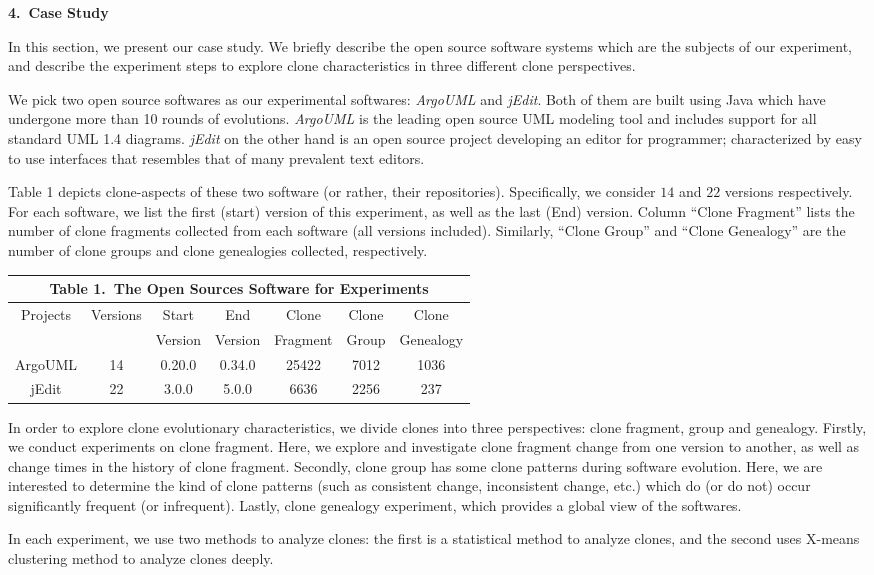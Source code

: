 \begin{center}{\large\bf 4.\ Case Study}\end{center}

In this section, we present our case study. 
We briefly describe the open source software systems which are the subjects of our experiment, and describe the experiment steps to explore clone characteristics in three different clone perspectives. 

We pick two open source softwares as our experimental softwares: {\em ArgoUML} and {\em jEdit}. Both of them are built using Java which have undergone more than 10 rounds of evolutions. {\em ArgoUML} is the leading open source UML modeling tool and includes support for all standard UML 1.4 diagrams. {\em jEdit} on the other hand is an open source project developing an editor for programmer; characterized by easy to use interfaces that resembles that of many prevalent text editors.

Table 1 depicts clone-aspects of these two software (or rather, their repositories). Specifically, we consider $14$ and $22$ versions respectively.  For each software, we list the first (start) version of this experiment, as well as the last (End) version. Column ``Clone Fragment'' lists the number of clone fragments collected from each software (all versions included). Similarly, ``Clone Group'' and ``Clone Genealogy'' are the number of clone groups and clone genealogies collected, respectively. 

{\tabcolsep=2.5pt 
\scriptsize
\begin{center}
\begin{tabular}{|c|c|c|c|c|c|c|}
\multicolumn{7}{c}{\bf Table 1.\ The Open Sources Software for Experiments}\\ \hline
\multirow{2}{*}{Projects}&\multirow{2}{*}{Versions}&Start&End&Clone&Clone&Clone\\ 
&&Version&Version&Fragment&Group&Genealogy\\ \hline
ArgoUML&14&0.20.0&0.34.0&25422&7012&1036\\ \hline
jEdit&22&3.0.0&5.0.0&6636&2256	&237\\ \hline
\end{tabular}
\end{center}}

In order to explore clone evolutionary characteristics, we divide clones into three perspectives: clone fragment, group and genealogy. Firstly, we conduct experiments on clone fragment. Here, we explore and investigate clone fragment change from one version to another, as well as change times in the history of clone fragment. Secondly, clone group has some clone patterns during software evolution. Here, we are interested to determine the kind of clone patterns (such as consistent change, inconsistent change, etc.) which do (or do not) occur significantly frequent (or infrequent). Lastly, clone genealogy experiment, which provides a global view of the softwares. 

In each experiment, we use two methods to analyze clones: the first is a statistical method to analyze clones, and the second uses X-means clustering method to analyze clones deeply.  


